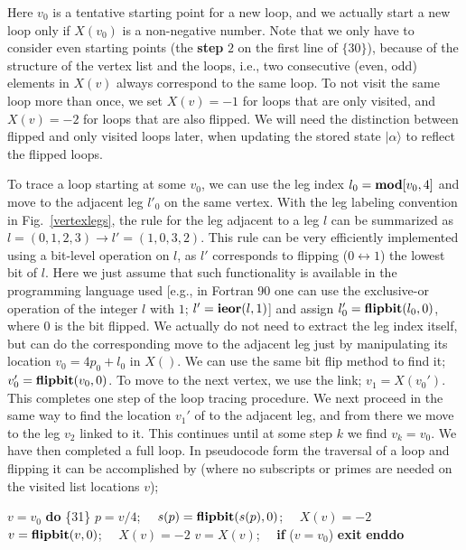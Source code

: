 \documentclass[draft,numberedheadings]{aipproc}
\newcommand{\code}{\null\vskip-2mm\noindent}
\newcommand{\br}{\hfill\break}
\newcommand{\cia}{\null\hskip5mm}
\newcommand{\cib}{\null\hskip10mm}
\begin{document}
\noindent
Here $v_0$ is a tentative starting point for a new loop, and we actually start a new loop only if $X(v_0)$ is a non-negative number. Note that we only have to 
consider even starting points (the {\bf step} $2$ on the first line of $\{30\}$), because of the structure of the vertex list and the loops, i.e., two consecutive 
(even, odd) elements in $X(v)$ always correspond to the same loop. To not visit the same loop more than once, we set $X(v)=-1$ for loops that are only visited, and $X(v)=-2$ 
for loops that are also flipped. We will need the distinction between flipped and only visited loops later, when updating the stored state $|\alpha\rangle$ to 
reflect the flipped loops. 

To trace a loop starting at some $v_0$, we can use the leg index $l_0={\bf mod}[v_0,4]$ and move to the adjacent leg $l'_0$ on the same vertex. With the 
leg labeling convention in Fig.~\ref{vertexlegs}, the rule for the leg adjacent to a leg $l$ can be summarized as $l=(0,1,2,3) \to l'=(1,0,3,2)$. This 
rule can be very efficiently implemented using a bit-level operation on $l$, as $l'$ corresponds to flipping 
($0\leftrightarrow 1$) the lowest bit of $l$. Here we just assume that such functionality is available in the programming language used [e.g., in Fortran 90 
one can use the exclusive-or operation of the integer $l$ with $1$;  $l'={\bf ieor}(l,1)$] and assign $l'_0={\bf flipbit}(l_0,0)$, where $0$ is the bit flipped. 
We actually do not need to extract the leg index itself, but can do the corresponding move to the adjacent leg just by manipulating its location $v_0=4p_0+l_0$ 
in $X()$. We can use the same bit flip method to find it; $v_0'={\bf flipbit}(v_0,0)$. To move to the next vertex, we use the link; $v_1=X(v_0')$. This completes 
one step of the loop tracing procedure. We next proceed in the same way to find the location $v_1'$ of to the adjacent leg, and from there we move to the leg 
$v_2$ linked to it. This continues until at some step $k$ we find $v_k=v_0$. We have then completed a full loop. In pseudocode form the traversal of a loop and 
flipping it can be accomplished by (where no subscripts or primes are needed on the visited list locations $v$);

{\code
\cia       $v=v_0$ \br
\cia       {\bf do}                         \hfill \{31\} \break             
\cib            $p=v/4$;~~ $s(p)={\bf flipbit}(s(p),0)$;~~ $X(v)=-2$  \br
\cib            $v={\bf flipbit}(v,0)$;~~ $X(v)=-2$ \br
\cib            $v=X(v)$;~~ {\bf if} ($v=v_0$) {\bf exit} \br
\cia        {\bf enddo}
\code}
\end{document}
